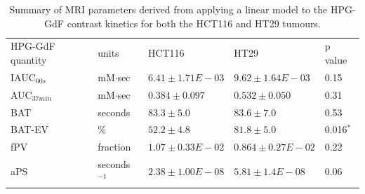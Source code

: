\begin{table}[htbp]
\begin{tabular}{@{}lllll@{}}
    \rowcolor{gray!50}
\acs{HPG-GdF} quantity & units     & HCT116           & HT29             & p value \\%
IAUC$_{60s}$  & mM$\cdot$sec    & $6.41\pm1.71 E-03$ & $9.62\pm1.64E-03$  & 0.15   \\
AUC$_{37min}$  & mM$\cdot$sec    & $0.384\pm0.097$    & $0.532\pm0.050$    & 0.31   \\
\acs{BAT}         & seconds   & $83.3\pm5.0$       & $83.6\pm7.0$       & 0.53   \\
BAT-EV      & \%         & $52.2\pm4.8$       & $81.8\pm5.0$       & 0.016$^{*}$ \\
\acs{fPV}         & fraction  & $1.07\pm0.33E-02$  & $0.864\pm0.27E-02$ & 0.22   \\
\acs{aPS}         & seconds$^{-1}$ & $2.38\pm1.00E-08$  & $5.81\pm1.4E-08$   & 0.06  %
\end{tabular}
\caption{Summary of MRI parameters derived from applying a linear model to the \acs{HPG-GdF} contrast kinetics for both the HCT116 and HT29 tumours.}
\label{hpgpaper:table3}
\end{table}

